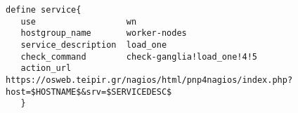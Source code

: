 \begin{lstlisting}[caption=Nagios configuation service template,label=nagiosservice]
define service{
   use                  wn
   hostgroup_name       worker-nodes
   service_description  load_one
   check_command        check-ganglia!load_one!4!5
   action_url           https://osweb.teipir.gr/nagios/html/pnp4nagios/index.php?host=$HOSTNAME$&srv=$SERVICEDESC$
   }
\end{lstlisting}

